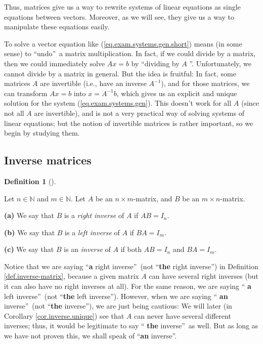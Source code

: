 \documentclass[numbers=enddot,12pt,final,onecolumn,notitlepage]{scrartcl}%
\theoremstyle{definition}
\newtheorem{defi}[theo]{Definition}
\newenvironment{definition}[1][]
{\begin{defi}[#1]\begin{leftbar}}
{\end{leftbar}\end{defi}}
\begin{document}
Thus, matrices give us a way to rewrite systems of linear equations as single
equations between vectors. Moreover, as we will see, they give us a way to
manipulate these equations easily.

To solve a vector equation like (\ref{eq.exam.systems.gen.short}) means (in
some sense) to \textquotedblleft undo\textquotedblright\ a matrix
multiplication. In fact, if we could divide by a matrix, then we could
immediately solve $Ax=b$ by \textquotedblleft dividing by $A$%
\textquotedblright. Unfortunately, we cannot divide by a matrix in general.
But the idea is fruitful: In fact, some matrices $A$ are invertible (i.e.,
have an inverse $A^{-1}$), and for those matrices, we can transform $Ax=b$
into $x=A^{-1}b$, which gives us an explicit and unique solution for the
system (\ref{eq.exam.systems.gen}). This doesn't work for all $A$ (since not
all $A$ are invertible), and is not a very practical way of solving systems of
linear equations; but the notion of invertible matrices is rather important,
so we begin by studying them.

\subsection{Inverse matrices}

\begin{definition}
\label{def.inverse-matrix}Let $n\in\mathbb{N}$ and $m\in\mathbb{N}$. Let $A$
be an $n\times m$-matrix, and $B$ be an $m\times n$-matrix.

\textbf{(a)} We say that $B$ is a \textit{right inverse} of $A$ if $AB=I_{n}$.

\textbf{(b)} We say that $B$ is a \textit{left inverse} of $A$ if $BA=I_{m}$.

\textbf{(c)} We say that $B$ is an \textit{inverse} of $A$ if both $AB=I_{n}$
and $BA=I_{m}$.
\end{definition}

Notice that we are saying \textquotedblleft\textbf{a} right
inverse\textquotedblright\ (not \textquotedblleft\textbf{the} right
inverse\textquotedblright) in Definition \ref{def.inverse-matrix}, because a
given matrix $A$ can have several right inverses (but it can also have no
right inverses at all). For the same reason, we are saying \textquotedblleft%
\textbf{a} left inverse\textquotedblright\ (not \textquotedblleft\textbf{the}
left inverse\textquotedblright). However, when we are saying \textquotedblleft%
\textbf{an} inverse\textquotedblright\ (not \textquotedblleft\textbf{the}
inverse\textquotedblright), we are just being cautious: We will later (in
Corollary \ref{cor.inverse.unique}) see that $A$ can never have several
different inverses; thus, it would be legitimate to say \textquotedblleft%
\textbf{the} inverse\textquotedblright\ as well. But as long as we have not
proven this, we shall speak of \textquotedblleft\textbf{an}
inverse\textquotedblright.
\end{document}
